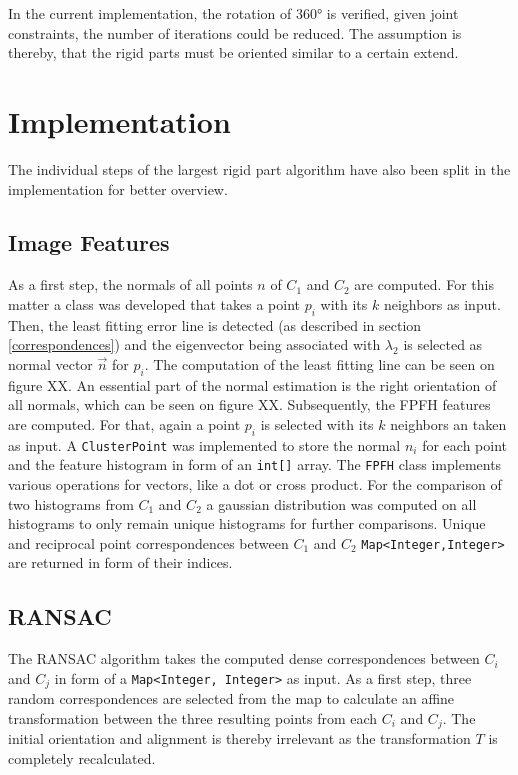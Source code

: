 
In the current implementation, the rotation of 360° is verified, given joint constraints, the number of iterations could be reduced. The assumption is thereby, that the rigid parts must be oriented similar to a certain extend.

\section{Implementation}
\label{ImplementationLRP}
The individual steps of the largest rigid part algorithm have also been split in the implementation for better overview. 
%
%
\subsection{Image Features}
%
%
As a first step, the normals of all points $n$ of $C_1$ and $C_2$ are computed. For this matter a class was developed that takes a point $p_i$ with its $k$ neighbors as input. Then, the least fitting error line is detected (as described in section \ref{correspondences}) and the eigenvector being associated with $\lambda_2$ is selected as normal vector $\vec{n}$ for $p_i$. 
The computation of the least fitting line can be seen on figure XX.
An essential part of the normal estimation is the right orientation of all normals, which can be seen on figure XX.
Subsequently, the FPFH features are computed. For that, again a point $p_i$ is selected with its $k$ neighbors an taken as input. A \texttt{ClusterPoint} was implemented to store the normal $n_i$ for each point and the feature histogram in form of an \texttt{int[]} array. The \texttt{FPFH} class implements various operations for vectors, like a dot or cross product. For the comparison of two histograms from $C_1$ and $C_2$ a gaussian distribution was computed on all histograms to only remain unique histograms for further comparisons. Unique and reciprocal point correspondences between $C_1$ and $C_2$ \texttt{Map<Integer,Integer>} are returned  in form of their indices.


\subsection{RANSAC}
\label{RANSAC}
The RANSAC algorithm takes the computed dense correspondences between $C_i$ and $C_j$ in form of a \texttt{Map<Integer, Integer>} as input. As a first step, three random correspondences are selected from the map to calculate an affine transformation between the three resulting points from each $C_i$ and $C_j$. The initial orientation and alignment is thereby irrelevant as the transformation $T$ is completely recalculated.

